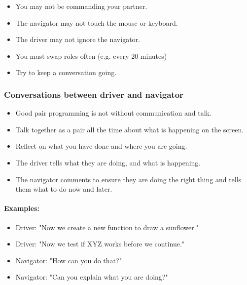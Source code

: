 \documentclass[
]{article}
\begin{document}
\begin{itemize}
\item
  You may not be commanding your partner.
\item
  The navigator may not touch the mouse or keyboard.
\item
  The driver may not ignore the navigator.
\item
  You must swap roles often (e.g. every 20 minutes)
\item
  Try to keep a conversation going.
\end{itemize}

\hypertarget{conversations-between-driver-and-navigator}{%
\subsubsection{Conversations between driver and
navigator}\label{conversations-between-driver-and-navigator}}

\begin{itemize}
\item
  Good pair programming is not without communication and talk.
\item
  Talk together as a pair all the time about what is happening on the
  screen.
\item
  Reflect on what you have done and where you are going.
\item
  The driver tells what they are doing, and what is happening.
\item
  The navigator comments to ensure they are doing the right thing and
  tells them what to do now and later.
\end{itemize}

\hypertarget{examples}{%
\paragraph{Examples:}\label{examples}}

\begin{itemize}
\item
  Driver: "Now we create a new function to draw a sunflower."
\item
  Driver: "Now we test if XYZ works before we continue."
\item
  Navigator: "How can you do that?"
\item
  Navigator: "Can you explain what you are doing?"
\end{itemize}
\end{document}
